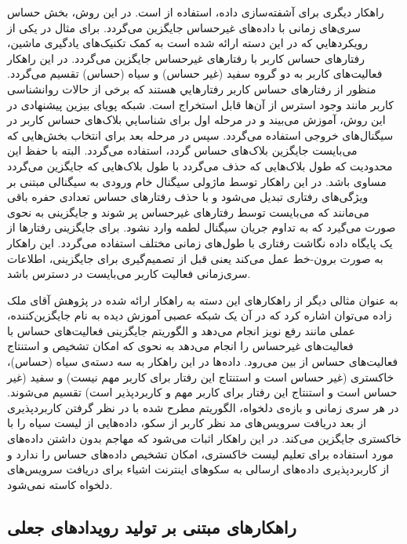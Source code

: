 راهکار دیگری برای آشفته‌سازی داده، استفاده از  است. در این روش، بخش حساس سری‌‌‌های زمانی با داده‌‌‌های غيرحساس جايگزين می‌‌‌گردد. برای مثال در یکی از رويکردهايي که در این دسته ارائه شده است \cite{x3141} به کمک تکنيک‌‌‌های يادگيری ماشين، رفتارهای حساس کاربر با رفتارهای غيرحساس جايگزين می‌‌‌گردد. در اين راهکار فعاليت‌های کاربر به دو گروه سفيد (غیر حساس) و سياه (حساس) تقسیم می‌‌‌گردد. منظور از رفتارهای حساس کاربر رفتارهايي هستند که برخی از حالات روانشناسی کاربر مانند وجود استرس از آن‌ها قابل استخراج است. شبکه پویای بیزین پیشنهادی در این روش، آموزش می‌‌‌بیند و در مرحله اول برای شناسايي بلاک‌های حساس کاربر در سیگنال‌های خروجی استفاده می‌‌‌گردد. سپس در مرحله بعد برای انتخاب بخش‌هایی که می‌‌‌بایست جایگزین بلاک‌های حساس گردد، استفاده می‌‌‌گردد. البته با حفظ این محدودیت که طول بلاک‌هایی که حذف می‌‌‌گردد با طول بلاک‌هایی که جایگزین می‌‌‌گردد مساوی باشد. در این راهکار توسط ماژولی سیگنال خام ورودی به سیگنالی مبتنی بر ويژگی‌‌‌های رفتاری تبديل می‌‌‌شود و با حذف رفتارهای حساس تعدادی حفره باقی می‌‌‌مانند که می‌‌‌بایست توسط رفتارهای غیرحساس پر شوند و جایگزینی به نحوی صورت می‌‌‌گیرد که به تداوم جریان سیگنال لطمه وارد نشود. برای جایگزینی رفتارها از یک پایگاه داده نگاشت رفتاری با طول‌های زمانی مختلف استفاده می‌‌‌گردد. اين راهکار به صورت برون-خط عمل می‌‌‌کند یعنی قبل از تصميم‌‌‌گيری برای جايگزينی، اطلاعات سری‌‌‌زمانی فعاليت کاربر می‌‌‌بایست در دسترس باشد. 

به عنوان مثالی ديگر از راهکارهای این دسته به راهکار ارائه شده در پژوهش آقای ملک زاده \cite{x3142} می‌‌‌توان اشاره کرد که در آن يک شبکه عصبی آموزش ديده به نام  جایگزین‌کننده، عملی مانند رفع نويز انجام می‌‌‌دهد و الگوریتم جایگزینی فعاليت‌های حساس با فعاليت‌های غيرحساس را انجام می‌‌‌دهد به نحوی که امکان تشخیص و استنتاج فعاليت‌های حساس از بین می‌‌‌رود. داده‌ها در این راهکار به سه دسته‌ی سیاه (حساس)، خاکستری (غیر حساس است و استنتاج این رفتار برای کاربر مهم نیست) و سفید (غیر حساس است و استنتاج این رفتار برای کاربر مهم و کاربردپذیر است) تقسیم می‌شوند. در هر سری زمانی و بازه‌ی دلخواه، الگوریتم مطرح شده با در نظر گرفتن کاربردپذیری از بعد دريافت سرويس‌های مد نظر کاربر از سکو، داده‌هایی از لیست سیاه را با خاکستری جایگزین می‌کند. در این راهکار اثبات می‌‌‌شود که مهاجم بدون داشتن داده‌های مورد استفاده برای تعلیم لیست خاکستری، امکان تشخیص داده‌های حساس را ندارد و از کاربردپذیری داده‌‌‌های ارسالی به سکوهای اينترنت اشياء برای دريافت سرويس‌های دلخواه کاسته نمی‌‌‌شود.

\subsection{راهکارهای مبتنی بر تولید رویدادهای جعلی‌}‌

